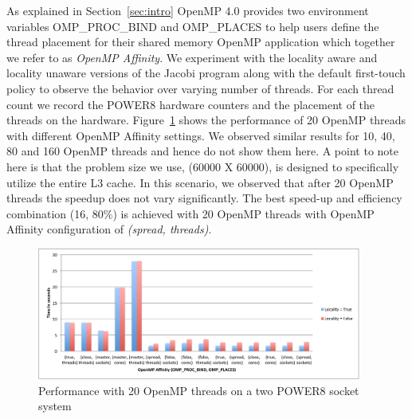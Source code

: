 As explained in Section~\ref{sec:intro} OpenMP 4.0 provides two environment variables OMP\_PROC\_BIND and OMP\_PLACES to help users define the thread placement for their shared memory OpenMP application which together we refer to as \textit{OpenMP Affinity}.%
%
 We experiment with the locality aware and locality unaware versions of the Jacobi program along with the default first-touch policy to observe the behavior over varying number of threads. 
 For each thread count we record the POWER8 hardware counters and the placement of the threads on the hardware. 
 Figure~\ref{fig:20th} shows the performance of 20 OpenMP threads with different OpenMP Affinity settings. We observed similar results for 10, 40, 80 and 160 OpenMP threads and hence do not show them here. A point to note here is that the problem size we use, (60000 X 60000), is designed to specifically utilize the entire L3 cache. In this scenario, we observed that after 20 OpenMP threads the speedup does not vary significantly. The best speed-up and efficiency combination (16, 80\%) is achieved with 20 OpenMP threads with OpenMP Affinity configuration of \textit{(spread, threads)}.
%
\begin{figure}[h!]
  \centering
  \includegraphics[height=0.4\textwidth, width=0.95\textwidth]{./Images/20Perf.pdf}
       \caption{Performance with 20 OpenMP threads on a two POWER8 socket system}
       \label{fig:20th}
\end{figure}
%
